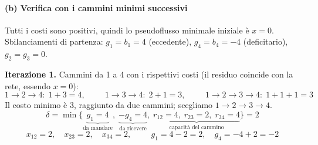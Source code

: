 \documentclass[12pt]{extarticle} %
\begin{document}
\paragraph{(b) Verifica con i cammini minimi successivi}
Tutti i costi sono positivi, quindi lo pseudoflusso minimale iniziale è $x = 0$. Sbilanciamenti di partenza: $g_1 = b_1 = 4$ (eccedente), $g_4 = b_4 = -4$ (deficitario), $g_2 = g_3 = 0$.

\noindent\textbf{Iterazione 1.} Cammini da 1 a 4 con i rispettivi costi (il residuo coincide con la rete, essendo $x=0$):
\[
1\to2\to4:\; 1 + 3 = 4, \hspace{1cm}
1\to3\to4:\; 2 + 1 = 3, \hspace{1cm}
1\to2\to3\to4:\; 1 + 1 + 1 = 3
\]
Il costo minimo è 3, raggiunto da due cammini; scegliamo $1\to2\to3\to4$.
\[
\delta = \min\{\underbrace{g_1 = 4}_{\text{da mandare}},\; \underbrace{-g_4 = 4}_{\text{da ricevere}},\; \underbrace{r_{12}=4,\; r_{23}=2,\; r_{34}=4}_{\text{capacità del cammino}}\} = 2
\]
\[
x_{12} = 2, \quad x_{23} = 2, \quad x_{34} = 2, \hspace{1cm} g_1 = 4-2 = 2, \quad g_4 = -4+2 = -2
\]

\begin{center}
\end{center}
\end{document}

